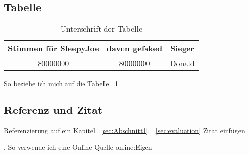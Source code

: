 \subsection{Tabelle}
\label{subsec:table}


\begin{table}[htb]
	\begin{center}
		\begin{tabular}[h]{c|c|c}	
			
			Stimmen für SleepyJoe & davon gefaked  & Sieger \\
			\hline
			80000000 & 80000000 & Donald \\
			\hline
		\end{tabular}
		\caption{Unterschrift  der Tabelle}
		\label{tab:Tabelle1}
	\end{center}
\end{table}

So beziehe ich mich auf die Tabelle ~\ref{tab:Tabelle1}


\subsection{Referenz und Zitat}
\label{subsec:refcite}
Referenzierung auf ein Kapitel ~\ref{sec:Abschnitt1}. ~\ref{sec:evaluation}
Zitat einfügen

\cite{stinyAktiveElektronischeBauelemente2019}.
\cite{aasdBlabla2021}
So verwende ich eine Online Quelle \gls{online:Eigen}
